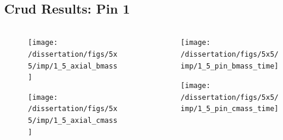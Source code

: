 \documentclass[t, pdftex]{beamer}
\begin{document}
\subsection*{Crud Results: Pin 1}
\begin{frame}
\vspace{-32pt}
\begin{columns}
    \begin{column}{0.5\textwidth}
        \begin{figure}[H]%
            \texttt{[image: /dissertation/figs/5x5/imp/1\_5\_axial\_bmass]}
        \end{figure}
        \vspace{-26pt}
        \begin{figure}[H]%
            \texttt{[image: /dissertation/figs/5x5/imp/1\_5\_axial\_cmass]}
        \end{figure}
    \end{column}
    \begin{column}{0.5\textwidth}
        \begin{figure}[H]%
            \texttt{[image: /dissertation/figs/5x5/imp/1\_5\_pin\_bmass\_time]}
        \end{figure}
        \vspace{-26pt}
        \begin{figure}[H]%
            \texttt{[image: /dissertation/figs/5x5/imp/1\_5\_pin\_cmass\_time]}
        \end{figure}
    \end{column}
\end{columns}
\end{frame}
\end{document}
